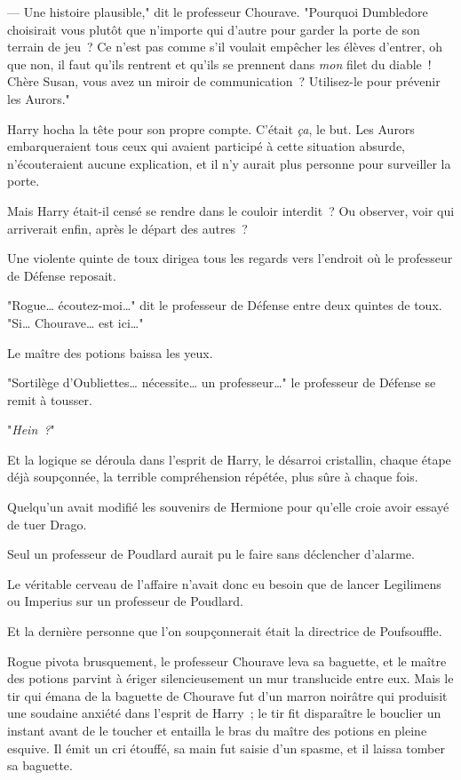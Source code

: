 --- Une histoire plausible," dit le professeur Chourave. "Pourquoi Dumbledore choisirait vous plutôt que n'importe qui d'autre pour garder la porte de son terrain de jeu~? Ce n'est pas comme s'il voulait empêcher les élèves d'entrer, oh que non, il faut qu'ils rentrent et qu'ils se prennent dans \emph{mon} filet du diable~! Chère Susan, vous avez un miroir de communication~? Utilisez-le pour prévenir les Aurors."

Harry hocha la tête pour son propre compte. C'était \emph{ça}, le but. Les Aurors embarqueraient tous ceux qui avaient participé à cette situation absurde, n'écouteraient aucune explication, et il n'y aurait plus personne pour surveiller la porte.

Mais Harry était-il censé se rendre dans le couloir interdit~? Ou observer, voir qui arriverait enfin, après le départ des autres~?

Une violente quinte de toux dirigea tous les regards vers l'endroit où le professeur de Défense reposait.

"Rogue… écoutez-moi…" dit le professeur de Défense entre deux quintes de toux. "Si… Chourave… est ici…"

Le maître des potions baissa les yeux.

"Sortilège d'Oubliettes… nécessite… un professeur…" le professeur de Défense se remit à tousser.

"\emph{Hein~?}"

Et la logique se déroula dans l'esprit de Harry, le désarroi cristallin, chaque étape déjà soupçonnée, la terrible compréhension répétée, plus sûre à chaque fois.

Quelqu'un avait modifié les souvenirs de Hermione pour qu'elle croie avoir essayé de tuer Drago.

Seul un professeur de Poudlard aurait pu le faire sans déclencher d'alarme.

Le véritable cerveau de l'affaire n'avait donc eu besoin que de lancer Legilimens ou Imperius sur un professeur de Poudlard.

Et la dernière personne que l'on soupçonnerait était la directrice de Poufsouffle.

Rogue pivota brusquement, le professeur Chourave leva sa baguette, et le maître des potions parvint à ériger silencieusement un mur translucide entre eux. Mais le tir qui émana de la baguette de Chourave fut d'un marron noirâtre qui produisit une soudaine anxiété dans l'esprit de Harry~; le tir fit disparaître le bouclier un instant avant de le toucher et entailla le bras du maître des potions en pleine esquive. Il émit un cri étouffé, sa main fut saisie d'un spasme, et il laissa tomber sa baguette.

